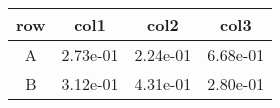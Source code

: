 \begin{tabular}{cccc}
\toprule
row&col1&col2&col3\tabularnewline
\midrule
A&2.73e-01&2.24e-01&6.68e-01\tabularnewline
B&3.12e-01&4.31e-01&2.80e-01\tabularnewline
\bottomrule
\end{tabular}
